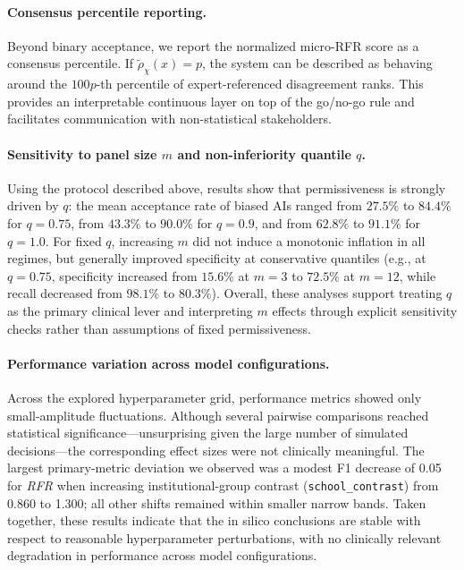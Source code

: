 \documentclass[12pt]{article}
\begin{document}
\paragraph{Consensus percentile reporting.}
Beyond binary acceptance, we report the normalized micro-RFR score as a consensus percentile. If $\tilde{\rho}_{\chi}(x)=p$, the system can be described as behaving around the $100p$-th percentile of expert-referenced disagreement ranks. This provides an interpretable continuous layer on top of the go/no-go rule and facilitates communication with non-statistical stakeholders.

\paragraph{Sensitivity to panel size $m$ and non-inferiority quantile $q$.}
Using the protocol described above, results show that permissiveness is strongly driven by $q$: the mean acceptance rate of biased AIs ranged from $27.5\%$ to $84.4\%$ for $q=0.75$, from $43.3\%$ to $90.0\%$ for $q=0.9$, and from $62.8\%$ to $91.1\%$ for $q=1.0$. For fixed $q$, increasing $m$ did not induce a monotonic inflation in all regimes, but generally improved specificity at conservative quantiles (e.g., at $q=0.75$, specificity increased from $15.6\%$ at $m=3$ to $72.5\%$ at $m=12$, while recall decreased from $98.1\%$ to $80.3\%$). Overall, these analyses support treating $q$ as the primary clinical lever and interpreting $m$ effects through explicit sensitivity checks rather than assumptions of fixed permissiveness.

\paragraph{Performance variation across model configurations.}
Across the explored hyperparameter grid, performance metrics showed only small-amplitude fluctuations. Although several pairwise comparisons reached statistical significance---unsurprising given the large number of simulated decisions---the corresponding effect sizes were not clinically meaningful. The largest primary-metric deviation we observed was a modest F1 decrease of 0.05 for \textit{RFR} when increasing institutional-group contrast (\texttt{school\_contrast}) from 0.860 to 1.300; all other shifts remained within smaller narrow bands. Taken together, these results indicate that the in silico conclusions are stable with respect to reasonable hyperparameter perturbations, with no clinically relevant degradation in performance across model configurations.
\end{document}
